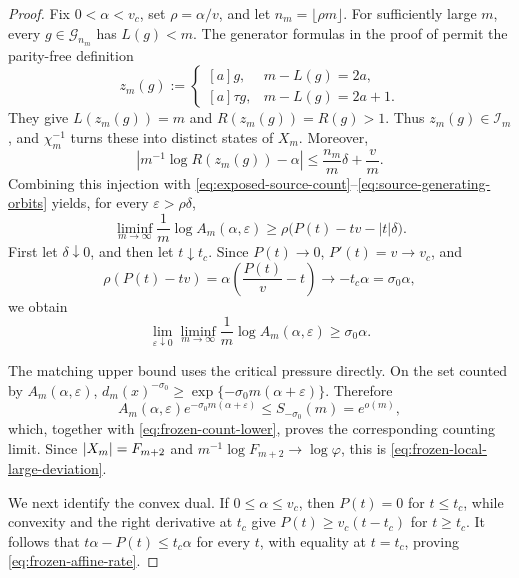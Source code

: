 \begin{proof}
Fix \(0<\alpha<v_c\), set \(\rho=\alpha/v\), and let
\(n_m=\lfloor\rho m\rfloor\).  For sufficiently large \(m\), every
\(g\in\mathcal G_{n_m}\) has \(L(g)<m\).  The generator formulas in the
proof of  permit the parity-free
definition
\[
 z_m(g):=
 \begin{cases}
 [a]g,&m-L(g)=2a,\\
 [a]\tau g,&m-L(g)=2a+1.
 \end{cases}
\]
They give \(L(z_m(g))=m\) and \(R(z_m(g))=R(g)>1\).  Thus
\(z_m(g)\in\mathcal I_m\), and \(\chi_m^{-1}\) turns these into distinct
states of \(X_m\).  Moreover,
\[
 \left|m^{-1}\log R(z_m(g))-\alpha\right|
 \le \frac{n_m}{m}\delta+\frac vm.
\]
Combining this injection with
\eqref{eq:exposed-source-count}--\eqref{eq:source-generating-orbits} yields,
for every \(\varepsilon>\rho\delta\),
\begin{equation}
 \liminf_{m\to\infty}\frac1m\log A_m(\alpha,\varepsilon)
 \ge \rho\bigl(P(t)-tv-|t|\delta\bigr).
 \label{eq:orbit-filling-lower-bound}
\end{equation}
First let \(\delta\downarrow0\), and then let \(t\downarrow t_c\).  Since
\(P(t)\to0\), \(P'(t)=v\to v_c\), and
\[
 \rho(P(t)-tv)=\alpha\left(\frac{P(t)}v-t\right)
 \longrightarrow-t_c\alpha=\sigma_0\alpha,
\]
we obtain
\begin{equation}
 \lim_{\varepsilon\downarrow0}\liminf_{m\to\infty}
 \frac1m\log A_m(\alpha,\varepsilon)
 \ge\sigma_0\alpha.
 \label{eq:frozen-count-lower}
\end{equation}

The matching upper bound uses the critical pressure directly.  On the set
counted by \(A_m(\alpha,\varepsilon)\),
\(d_m(x)^{-\sigma_0}\ge
\exp\{-\sigma_0m(\alpha+\varepsilon)\}\).  Therefore
\[
 A_m(\alpha,\varepsilon)
 e^{-\sigma_0m(\alpha+\varepsilon)}
 \le S_{-\sigma_0}(m)=e^{o(m)},
\]
which, together with \eqref{eq:frozen-count-lower}, proves the corresponding
counting limit.  Since \(\lvert X_m \rvert=F_{m+2}\) and
\(m^{-1}\log F_{m+2}\to\log\varphi\), this is
\eqref{eq:frozen-local-large-deviation}.

We next identify the convex dual.  If \(0\le\alpha\le v_c\), then
\(P(t)=0\) for \(t\le t_c\), while convexity and the right derivative at
\(t_c\) give \(P(t)\ge v_c(t-t_c)\) for \(t\ge t_c\).  It follows that
\(t\alpha-P(t)\le t_c\alpha\) for every \(t\), with equality at
\(t=t_c\), proving \eqref{eq:frozen-affine-rate}.


\end{proof}
